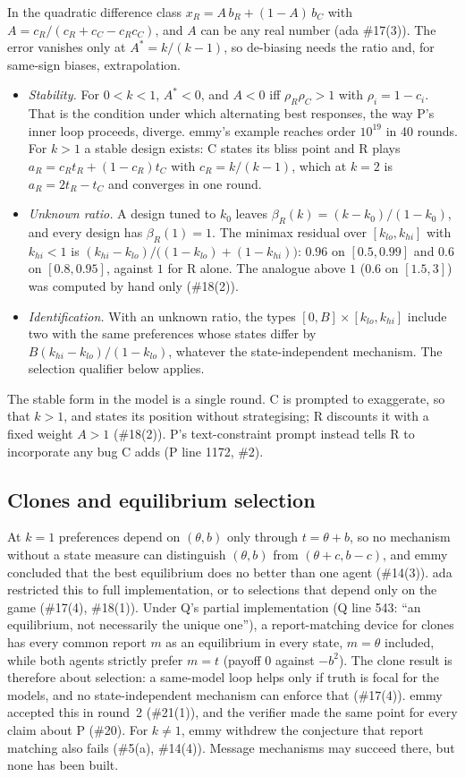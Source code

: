 \documentclass{article}
\begin{document}
In the quadratic difference class $x_R=A\,b_R+(1-A)\,b_C$ with
$A=c_R/(c_R+c_C-c_Rc_C)$, and $A$ can be any real number (ada \#17(3)).
The error vanishes only at $A^*=k/(k-1)$, so de-biasing needs the ratio
and, for same-sign biases, extrapolation.
\begin{itemize}
\item \emph{Stability.} For $0<k<1$, $A^*<0$, and $A<0$ iff
$\rho_R\rho_C>1$ with $\rho_i=1-c_i$. That is the condition under which
alternating best responses, the way P's inner loop proceeds, diverge.
emmy's example reaches order $10^{19}$ in 40 rounds. For $k>1$ a stable
design exists: C states its bliss point and R plays
$a_R=c_Rt_R+(1-c_R)t_C$ with $c_R=k/(k-1)$, which at $k=2$ is
$a_R=2t_R-t_C$ and converges in one round.
\item \emph{Unknown ratio.} A design tuned to $k_0$ leaves
$\beta_R(k)=(k-k_0)/(1-k_0)$, and every design has $\beta_R(1)=1$. The
minimax residual over $[k_{lo},k_{hi}]$ with $k_{hi}<1$ is
$(k_{hi}-k_{lo})/\bigl((1-k_{lo})+(1-k_{hi})\bigr)$: $0.96$ on
$[0.5,0.99]$ and $0.6$ on $[0.8,0.95]$, against $1$ for R alone. The
analogue above $1$ ($0.6$ on $[1.5,3]$) was computed by hand only
(\#18(2)).
\item \emph{Identification.} With an unknown ratio, the types
$[0,B]\times[k_{lo},k_{hi}]$ include two with the same preferences whose
states differ by $B(k_{hi}-k_{lo})/(1-k_{lo})$, whatever the
state-independent mechanism. The selection qualifier below applies.
\end{itemize}
The stable form in the model is a single round. C is prompted to
exaggerate, so that $k>1$, and states its position without strategising;
R discounts it with a fixed weight $A>1$ (\#18(2)). P's text-constraint
prompt instead tells R to incorporate any bug C adds (P line 1172, \#2).

\subsection{Clones and equilibrium selection}

At $k=1$ preferences depend on $(\theta,b)$ only through $t=\theta+b$, so
no mechanism without a state measure can distinguish $(\theta,b)$ from
$(\theta+c,b-c)$, and emmy concluded that the best equilibrium does no
better than one agent (\#14(3)). ada restricted this to full
implementation, or to selections that depend only on the game (\#17(4),
\#18(1)). Under Q's partial implementation (Q line 543: ``an equilibrium,
not necessarily the unique one''), a report-matching device for clones has
every common report $m$ as an equilibrium in every state, $m=\theta$
included, while both agents strictly prefer $m=t$ (payoff $0$ against
$-b^2$). The clone result is therefore about selection: a same-model loop
helps only if truth is focal for the models, and no state-independent
mechanism can enforce that (\#17(4)). emmy accepted this in round~2
(\#21(1)), and the verifier made the same point for every claim about P
(\#20). For $k\ne1$, emmy withdrew the conjecture that report matching
also fails (\#5(a), \#14(4)). Message mechanisms may succeed there, but
none has been built.
\end{document}

